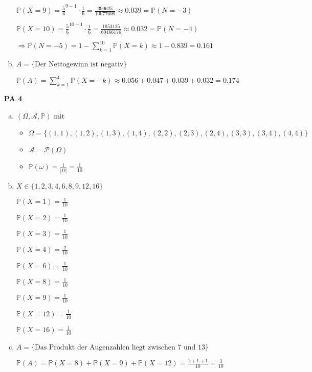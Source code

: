 \documentclass[a4paper,12pt]{article}
\newcommand{\PAufgabe}[1]{
        {
        \vspace*{0.5cm}
        \textbf{PA #1}
        \vspace*{0.2cm}
    }
}
\begin{document}
\begin{enumerate}[(a)]
        $ \displaystyle \mathbb{P}(X = 9) = \frac{5}{6}^{9 - 1} \cdot \frac{1}{6} = \frac{390625}{10077696} \approx 0.039 = \mathbb{P}(N = -3)$

        $ \displaystyle \mathbb{P}(X = 10) = \frac{5}{6}^{10 - 1} \cdot \frac{1}{6} = \frac{1953125}{60466176} \approx 0.032 = \mathbb{P}(N = -4) $

        $ \Rightarrow \mathbb{P}(N = -5) = 1 - \sum\limits_{k = 1}^{10} \mathbb{P}(X = k) \approx 1 - 0.839 = 0.161 $

        \item

        $ A = \{\text{Der Nettogewinn ist negativ}\} $

        $ \mathbb{P}(A) = \sum\limits_{k = 1}^{4} \mathbb{P}(X = -k) \approx 0.056 + 0.047 + 0.039 + 0.032 =  0.174 $
    \end{enumerate}

    \newpage

    \PAufgabe{4}
    \begin{enumerate}[(a)]
        \item 

        $ (\Omega, \mathcal{A}, \mathbb{P}) $ mit
        \begin{itemize}
            \item $ \Omega = \{(1, 1), (1, 2), (1, 3), (1, 4), (2, 2), (2, 3), (2, 4), (3, 3), (3, 4), (4, 4) \} $
            \item $ \mathcal{A} = \mathcal{P}(\Omega) $
            \item $ \mathbb{P}(\omega) = \frac{1}{|\Omega|} = \frac{1}{10} $
        \end{itemize}

        \item

        $ X \in \{1, 2, 3, 4, 6, 8, 9, 12, 16\} $

        $ \mathbb{P}(X = 1) = \frac{1}{10} $

        $ \mathbb{P}(X = 2) = \frac{1}{10} $

        $ \mathbb{P}(X = 3) = \frac{1}{10} $

        $ \mathbb{P}(X = 4) = \frac{2}{10} $

        $ \mathbb{P}(X = 6) = \frac{1}{10} $

        $ \mathbb{P}(X = 8) = \frac{1}{10} $

        $ \mathbb{P}(X = 9) = \frac{1}{10} $

        $ \mathbb{P}(X = 12) = \frac{1}{10} $

        $ \mathbb{P}(X = 16) = \frac{1}{10} $

        \item

        $ A = \{\text{Das Produkt der Augenzahlen liegt zwischen 7 und 13}\} $ 

        $ \mathbb{P}(A) = \mathbb{P}(X = 8) + \mathbb{P}(X = 9) + \mathbb{P}(X = 12) = \frac{1 + 1 + 1}{10} = \frac{3}{10} $

    \end{enumerate}
\end{document}
